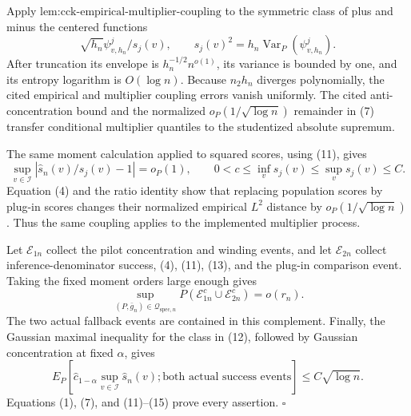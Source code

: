 Apply \(\text{lem:cck-empirical-multiplier-coupling}\) to the symmetric class of plus and minus the centered functions
\[
 \sqrt{h_n}\psi^j_{v,h_n}/s_j(v),
 \qquad s_j(v)^2=h_n\operatorname{Var}_P(\psi^j_{v,h_n}). \tag{12}
\]
After truncation its envelope is \(h_n^{-1/2}n^{o(1)}\), its variance is bounded by one, and its entropy logarithm is \(O(\log n)\). Because \(n_2h_n\) diverges polynomially, the cited empirical and multiplier coupling errors vanish uniformly. The cited anti-concentration bound and the normalized \(o_P(1/\sqrt{\log n})\) remainder in (7) transfer conditional multiplier quantiles to the studentized absolute supremum.

The same moment calculation applied to squared scores, using (11), gives
\[
 \sup_{v\in\mathcal I}|\widehat s_n(v)/s_j(v)-1|=o_P(1),
 \qquad 0<c\le\inf_vs_j(v)\le\sup_vs_j(v)\le C. \tag{13}
\]
Equation (4) and the ratio identity show that replacing population scores by plug-in scores changes their normalized empirical \(L^2\) distance by \(o_P(1/\sqrt{\log n})\). Thus the same coupling applies to the implemented multiplier process.

Let \(\mathcal E_{1n}\) collect the pilot concentration and winding events, and let \(\mathcal E_{2n}\) collect inference-denominator success, (4), (11), (13), and the plug-in comparison event. Taking the fixed moment orders large enough gives
\[
 \sup_{(P,\bar g_n)\in\mathcal Q_{\mathrm{spec},n}}
 P(\mathcal E_{1n}^c\cup\mathcal E_{2n}^c)=o(r_n). \tag{14}
\]
The two actual fallback events are contained in this complement. Finally, the Gaussian maximal inequality for the class in (12), followed by Gaussian concentration at fixed \(\alpha\), gives
\[
 E_P\left[\widehat c_{1-\alpha}\sup_{v\in\mathcal I}\widehat s_n(v);
 \text{both actual success events}\right]\le C\sqrt{\log n}. \tag{15}
\]
Equations (1), (7), and (11)--(15) prove every assertion. \(\square\)